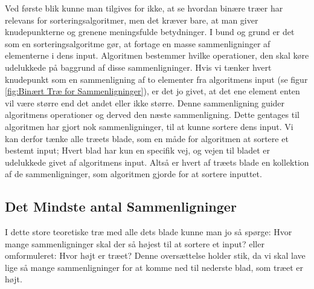 Ved første blik kunne man tilgives for ikke, at se hvordan binære træer har relevans for sorteringsalgoritmer, men det kræver bare, at man giver knudepunkterne og grenene meningsfulde betydninger. I bund og grund er det som en sorteringsalgoritme gør, at fortage en masse sammenligninger af elementerne i dens input. Algoritmen bestemmer hvilke operationer, den skal køre udelukkede på baggrund af disse sammenligninger. Hvis vi tænker hvert knudepunkt som en sammenligning af to elementer fra algoritmens input (se figur \ref{fig:Binært Træ for Sammenligninger}), er det jo givet, at det ene element enten vil være større end det andet eller ikke større. Denne sammenligning guider algoritmens operationer og derved den næste sammenligning. Dette gentages til algoritmen har gjort nok sammenligninger, til at kunne sortere dens input. Vi kan derfor tænke alle træets blade, som en måde for algoritmen at sortere et bestemt input; Hvert blad har kun en specifik vej, og vejen til bladet er udelukkede givet af algoritmens input. Altså er hvert af træets blade en kollektion af de sammenligninger, som algoritmen gjorde for at sortere inputtet. \cite[s. 109]{aogd}

\subsection{Det Mindste antal Sammenligninger}%
\label{sub:Det Mindste antal Sammenligninger}

I dette store teoretiske træ med alle dets blade kunne man jo så spørge: Hvor mange sammenligninger skal der så højest til at sortere et input? eller omformuleret: Hvor højt er træet? Denne oversættelse holder stik, da vi skal lave lige så mange sammenligninger for at komme ned til nederste blad, som træet er højt.

